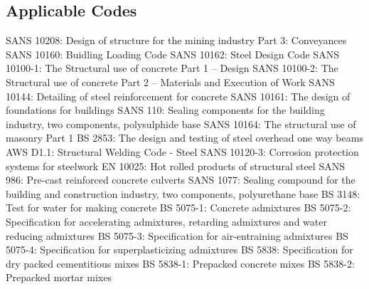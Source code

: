 \documentclass{article}%
\begin{document}
\subsection{Applicable Codes}%
\label{subsec:ApplicableCodes}%
\begin{flushleft}%
SANS 10208: Design of structure for the mining industry Part 3: Conveyances%
\linebreak%
SANS 10160: Buidling Loading Code%
\linebreak%
SANS 10162: Steel Design Code%
\linebreak%
SANS 10100{-}1: The Structural use of concrete Part 1 – Design%
\linebreak%
SANS 10100{-}2: The Structural use of concrete Part 2 – Materials and Execution of Work%
\linebreak%
SANS 10144: Detailing of steel reinforcement for concrete%
\linebreak%
SANS 10161: The design of foundations for buildings%
\linebreak%
SANS 110: Sealing components for the building industry, two components, polysulphide base%
\linebreak%
SANS 10164: The structural use of masonry Part 1%
\linebreak%
BS 2853: The design and testing of steel overhead one way beams%
\linebreak%
AWS D1.1: Structural Welding Code {-} Steel%
\linebreak%
SANS 10120{-}3: Corrosion protection systems for steelwork%
\linebreak%
EN 10025: Hot rolled products of structural steel%
\linebreak%
SANS 986: Pre{-}cast reinforced concrete culverts%
\linebreak%
SANS 1077: Sealing compound for the building and construction industry, two components, polyurethane base%
\linebreak%
BS 3148: Test for water for making concrete%
\linebreak%
BS 5075{-}1: Concrete admixtures%
\linebreak%
BS 5075{-}2: Specification for accelerating admixtures, retarding admixtures and water reducing admixtures%
\linebreak%
BS 5075{-}3: Specification for air{-}entraining admixtures%
\linebreak%
BS 5075{-}4: Specification for superplasticizing admixtures%
\linebreak%
BS 5838: Specification for dry packed cementitious mixes%
\linebreak%
BS 5838{-}1: Prepacked concrete mixes%
\linebreak%
BS 5838{-}2: Prepacked mortar mixes%
\linebreak%
\end{flushleft}
\end{document}
